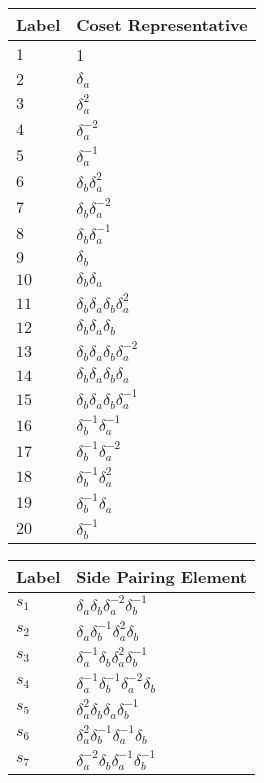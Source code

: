 \documentclass{article}
\begin{document}
\begin{center}
\begin{tabular}{ll}
\toprule
Label & Coset Representative\\
\midrule
$1$ & 1 \\
$2$ & $\delta_a^{}$ \\
$3$ & $\delta_a^{2}$ \\
$4$ & $\delta_a^{-2}$ \\
$5$ & $\delta_a^{-1}$ \\
$6$ & $\delta_b^{}\delta_a^{2}$ \\
$7$ & $\delta_b^{}\delta_a^{-2}$ \\
$8$ & $\delta_b^{}\delta_a^{-1}$ \\
$9$ & $\delta_b^{}$ \\
$10$ & $\delta_b^{}\delta_a^{}$ \\
$11$ & $\delta_b^{}\delta_a^{}\delta_b^{}\delta_a^{2}$ \\
$12$ & $\delta_b^{}\delta_a^{}\delta_b^{}$ \\
$13$ & $\delta_b^{}\delta_a^{}\delta_b^{}\delta_a^{-2}$ \\
$14$ & $\delta_b^{}\delta_a^{}\delta_b^{}\delta_a^{}$ \\
$15$ & $\delta_b^{}\delta_a^{}\delta_b^{}\delta_a^{-1}$ \\
$16$ & $\delta_b^{-1}\delta_a^{-1}$ \\
$17$ & $\delta_b^{-1}\delta_a^{-2}$ \\
$18$ & $\delta_b^{-1}\delta_a^{2}$ \\
$19$ & $\delta_b^{-1}\delta_a^{}$ \\
$20$ & $\delta_b^{-1}$ \\
\bottomrule
\end{tabular}
\hfill
\begin{tabular}{ll}
\toprule
Label & Side Pairing Element\\
\midrule
$s_{1}$ & $\delta_a^{}\delta_b^{}\delta_a^{-2}\delta_b^{-1}$ \\
$s_{2}$ & $\delta_a^{}\delta_b^{-1}\delta_a^{2}\delta_b^{}$ \\
$s_{3}$ & $\delta_a^{-1}\delta_b^{}\delta_a^{2}\delta_b^{-1}$ \\
$s_{4}$ & $\delta_a^{-1}\delta_b^{-1}\delta_a^{-2}\delta_b^{}$ \\
$s_{5}$ & $\delta_a^{2}\delta_b^{}\delta_a^{}\delta_b^{-1}$ \\
$s_{6}$ & $\delta_a^{2}\delta_b^{-1}\delta_a^{-1}\delta_b^{}$ \\
$s_{7}$ & $\delta_a^{-2}\delta_b^{}\delta_a^{-1}\delta_b^{-1}$ \\

\end{tabular}
\end{center}
\end{document}
